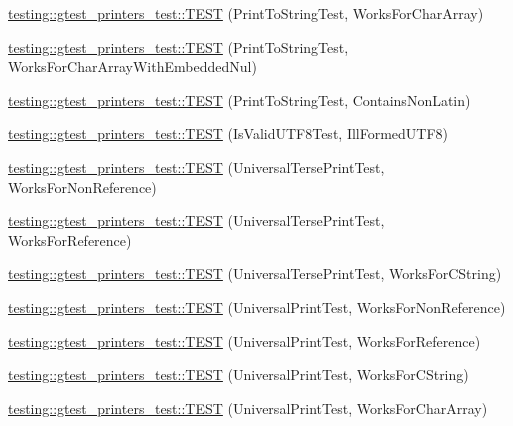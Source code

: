 \begin{DoxyCompactItemize}
\item 
\mbox{\hyperlink{namespacetesting_1_1gtest__printers__test_ad122dc21e7ebad023d7048ef117a1129}{testing\+::gtest\+\_\+printers\+\_\+test\+::\+T\+E\+ST}} (Print\+To\+String\+Test, Works\+For\+Char\+Array)
\item 
\mbox{\hyperlink{namespacetesting_1_1gtest__printers__test_a65e208358dddc7747f4519410c71d877}{testing\+::gtest\+\_\+printers\+\_\+test\+::\+T\+E\+ST}} (Print\+To\+String\+Test, Works\+For\+Char\+Array\+With\+Embedded\+Nul)
\item 
\mbox{\hyperlink{namespacetesting_1_1gtest__printers__test_aa313c2e91ba3b712501d6e7f393a592a}{testing\+::gtest\+\_\+printers\+\_\+test\+::\+T\+E\+ST}} (Print\+To\+String\+Test, Contains\+Non\+Latin)
\item 
\mbox{\hyperlink{namespacetesting_1_1gtest__printers__test_a5d5349c44a2f23e585ea503cff88056e}{testing\+::gtest\+\_\+printers\+\_\+test\+::\+T\+E\+ST}} (Is\+Valid\+U\+T\+F8\+Test, Ill\+Formed\+U\+T\+F8)
\item 
\mbox{\hyperlink{namespacetesting_1_1gtest__printers__test_ab49ff6527b0b01411b725fe46e1af65c}{testing\+::gtest\+\_\+printers\+\_\+test\+::\+T\+E\+ST}} (Universal\+Terse\+Print\+Test, Works\+For\+Non\+Reference)
\item 
\mbox{\hyperlink{namespacetesting_1_1gtest__printers__test_ab7adb58a0e08e0830157a5a1c7bceac5}{testing\+::gtest\+\_\+printers\+\_\+test\+::\+T\+E\+ST}} (Universal\+Terse\+Print\+Test, Works\+For\+Reference)
\item 
\mbox{\hyperlink{namespacetesting_1_1gtest__printers__test_ab11252e228a240a349d747546bc222d2}{testing\+::gtest\+\_\+printers\+\_\+test\+::\+T\+E\+ST}} (Universal\+Terse\+Print\+Test, Works\+For\+C\+String)
\item 
\mbox{\hyperlink{namespacetesting_1_1gtest__printers__test_a43d4efc91c2ea7d8220891df9b0437df}{testing\+::gtest\+\_\+printers\+\_\+test\+::\+T\+E\+ST}} (Universal\+Print\+Test, Works\+For\+Non\+Reference)
\item 
\mbox{\hyperlink{namespacetesting_1_1gtest__printers__test_a58ad7c81884e852b09646764ce14a47e}{testing\+::gtest\+\_\+printers\+\_\+test\+::\+T\+E\+ST}} (Universal\+Print\+Test, Works\+For\+Reference)
\item 
\mbox{\hyperlink{namespacetesting_1_1gtest__printers__test_ac20aca012aca1ca9589dbf7483fbbbd1}{testing\+::gtest\+\_\+printers\+\_\+test\+::\+T\+E\+ST}} (Universal\+Print\+Test, Works\+For\+C\+String)
\item 
\mbox{\hyperlink{namespacetesting_1_1gtest__printers__test_a23a9eda97679bfc29c87b8de17cc35bf}{testing\+::gtest\+\_\+printers\+\_\+test\+::\+T\+E\+ST}} (Universal\+Print\+Test, Works\+For\+Char\+Array)

\end{DoxyCompactItemize}
